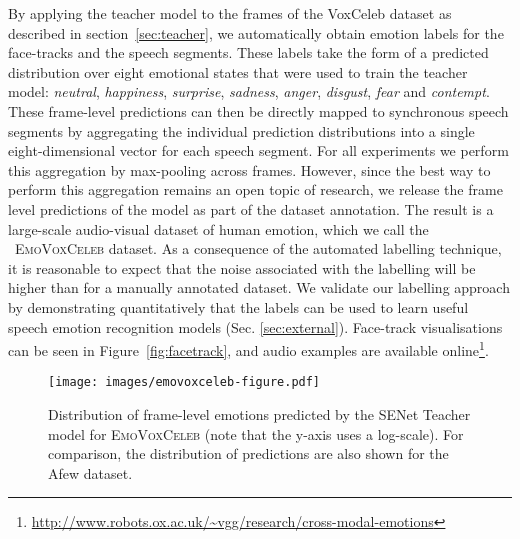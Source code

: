 \documentclass[sigconf]{acmart}
\newcommand{\datasetName}{\textsc{EmoVoxCeleb}}
\begin{document}
By applying the teacher model to the frames of the VoxCeleb dataset as
described in section~\ref{sec:teacher}, we automatically obtain
emotion labels for the face-tracks and the speech segments. These
labels take the form of a predicted distribution over eight emotional
states that were used to train the teacher model: \textit{neutral},
\textit{happiness}, \textit{surprise}, \textit{sadness},
\textit{anger}, \textit{disgust}, \textit{fear} and \textit{contempt}.
These frame-level predictions can then be directly mapped to
synchronous speech segments by aggregating the individual prediction
distributions into a single eight-dimensional vector for each speech
segment. For all experiments we perform this aggregation by
max-pooling across frames.  However,
since the best way to perform this aggregation remains an open topic
of research, we release the frame level predictions of the model as
part of the dataset annotation.  The result is a large-scale
audio-visual dataset of human emotion, which we call the
~\datasetName{} dataset.  As a consequence of the automated labelling
technique, it is reasonable to expect that the noise associated with
the labelling will be higher than for a manually annotated dataset.
We validate our labelling approach by demonstrating
quantitatively that the labels can be used to learn useful speech
emotion recognition models (Sec. \ref{sec:external}).  Face-track visualisations can be seen in
Figure~\ref{fig:facetrack}, and audio examples are available
online\footnote{\url{http://www.robots.ox.ac.uk/~vgg/research/cross-modal-emotions}}.


\begin{figure}[]
\centering
 \texttt{[image: images/emovoxceleb-figure.pdf]}
   \caption{Distribution of frame-level emotions predicted by the SENet Teacher model for \datasetName{} (note that the y-axis uses a log-scale). For comparison, the distribution of predictions are also shown for the Afew  dataset. }
\label{fig:distTracks}
\end{figure}
\end{document}
